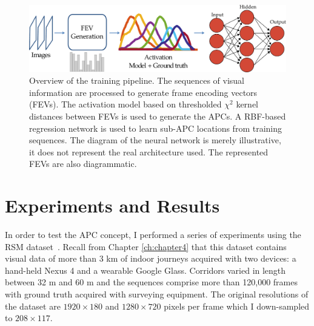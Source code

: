 \begin{figure}[h]
\centering
\includegraphics[width=\linewidth]{gfx/Chapter05/nn_pipelineFEV.pdf}
\caption{Overview of the training pipeline. The sequences of visual information are processed to generate frame encoding vectors (FEVs). The activation model based on thresholded $\chi^2$ kernel distances between FEVs is used to generate the APCs. A RBF-based regression network is used to learn sub-APC locations from training sequences. The diagram of the neural network is merely illustrative, it does not represent the real architecture used. The represented FEVs are also diagrammatic.}
\label{fig:pipeline}
\end{figure}




\section{Experiments and Results}
\label{sec:ch5experiments}

In order to test the APC concept, I performed a series of experiments using the RSM dataset~\cite{RiveraWearable}. Recall from Chapter \ref{ch:chapter4} that this dataset contains visual data of more than 3 km of indoor journeys acquired with two devices: a hand-held Nexus 4 and a wearable Google Glass. Corridors varied in length between 32 m and 60 m and the sequences comprise more than 120,000 frames with ground truth acquired with surveying equipment. The original resolutions of the dataset are $1920\times 180$  and $1280 \times 720$ pixels per frame which I down-sampled to $208 \times 117$. 



